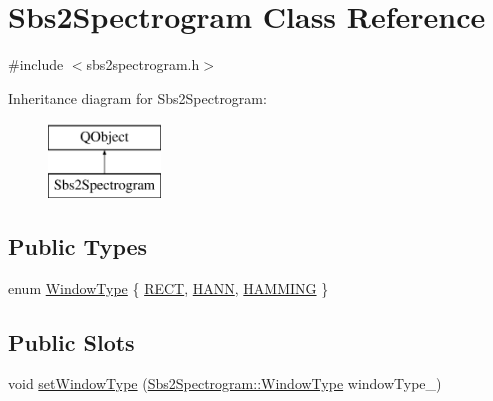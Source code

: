 \hypertarget{classSbs2Spectrogram}{\section{Sbs2\-Spectrogram Class Reference}
\label{classSbs2Spectrogram}
}


{\ttfamily \#include $<$sbs2spectrogram.\-h$>$}

Inheritance diagram for Sbs2\-Spectrogram\-:\begin{figure}[H]
\begin{center}
\leavevmode
\includegraphics[height=2.000000cm]{classSbs2Spectrogram}
\end{center}
\end{figure}
\subsection*{Public Types}
\begin{DoxyCompactItemize}
\item 
enum \hyperlink{classSbs2Spectrogram_a22265347883488b8385c83b67882d915}{Window\-Type} \{ \hyperlink{classSbs2Spectrogram_a22265347883488b8385c83b67882d915a53cead410460e1e97357918fb4551295}{R\-E\-C\-T}, 
\hyperlink{classSbs2Spectrogram_a22265347883488b8385c83b67882d915aedef05928888024ac640151a903ccd65}{H\-A\-N\-N}, 
\hyperlink{classSbs2Spectrogram_a22265347883488b8385c83b67882d915afcbd3c1363abfd250fad7cf50af578ff}{H\-A\-M\-M\-I\-N\-G}
 \}
\end{DoxyCompactItemize}
\subsection*{Public Slots}
\begin{DoxyCompactItemize}
\item 
void \hyperlink{classSbs2Spectrogram_aba3b9a1d6685a23737cf44f21a9dd57f}{set\-Window\-Type} (\hyperlink{classSbs2Spectrogram_a22265347883488b8385c83b67882d915}{Sbs2\-Spectrogram\-::\-Window\-Type} window\-Type\-\_\-)
\end{DoxyCompactItemize}

